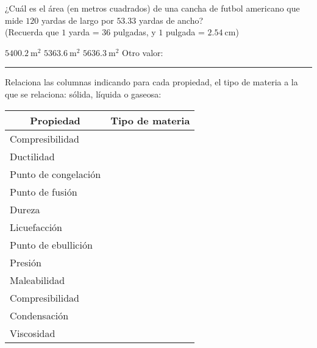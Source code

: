 \documentclass[14pt]{exam}
\begin{document}
\begin{questions}
    \question ¿Cuál es el área (en metros cuadrados) de una cancha de futbol americano que mide $120$ yardas de largo por $53.33$ yardas de ancho? \\[0.5em]
    (Recuerda que $1$ yarda = $36$ pulgadas, y $1$ pulgada = $\SI{2.54}{\centi\meter}$)
    \\[0.5em]
    \begin{oneparchoices}
        \choice $\SI{5400.2}{\square\meter}$
        \choice $\SI{5363.6}{\square\meter}$
        \choice $\SI{5636.3}{\square\meter}$
        \choice Otro valor: \rule{3cm}{0.1mm}
    \end{oneparchoices}
    \question Relaciona las columnas indicando para cada propiedad, el tipo de materia a la que se relaciona: sólida, líquida o gaseosa:
    \begin{table}[H]
        \renewcommand{\arraystretch}{1.2}
        \centering
        \begin{tabular}{l | l}
            \multicolumn{1}{c}{\textbf{Propiedad}} & \multicolumn{1}{|c}{\textbf{Tipo de materia}} \\ \hline
            Compresibilidad & \\ \hline
            Ductilidad & \\ \hline
            Punto de congelación & \\ \hline
            Punto de fusión & \\ \hline
            Dureza & \\ \hline
            Licuefacción & \\ \hline
            Punto de ebullición & \\ \hline
            Presión & \\ \hline
            Maleabilidad & \\ \hline
            Compresibilidad & \\ \hline
            Condensación & \\ \hline
            Viscosidad & \\ \hline
        \end{tabular}

\end{table}
\end{questions}
\end{document}
